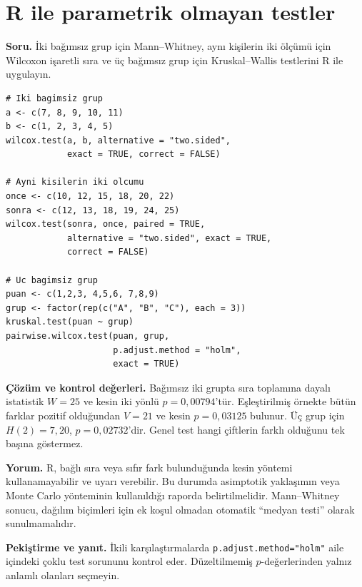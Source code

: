 \section{R ile parametrik olmayan testler}
\label{sec:r-nonparametric}

\textbf{Soru.} İki bağımsız grup için Mann--Whitney, aynı kişilerin iki
ölçümü için Wilcoxon işaretli sıra ve üç bağımsız grup için Kruskal--Wallis
testlerini R ile uygulayın.

\begin{lstlisting}[style=prismR]
# Iki bagimsiz grup
a <- c(7, 8, 9, 10, 11)
b <- c(1, 2, 3, 4, 5)
wilcox.test(a, b, alternative = "two.sided",
            exact = TRUE, correct = FALSE)

# Ayni kisilerin iki olcumu
once <- c(10, 12, 15, 18, 20, 22)
sonra <- c(12, 13, 18, 19, 24, 25)
wilcox.test(sonra, once, paired = TRUE,
            alternative = "two.sided", exact = TRUE,
            correct = FALSE)

# Uc bagimsiz grup
puan <- c(1,2,3, 4,5,6, 7,8,9)
grup <- factor(rep(c("A", "B", "C"), each = 3))
kruskal.test(puan ~ grup)
pairwise.wilcox.test(puan, grup,
                     p.adjust.method = "holm",
                     exact = TRUE)
\end{lstlisting}

\begin{outputguidebox}
\textbf{Çözüm ve kontrol değerleri.} Bağımsız iki grupta sıra toplamına
dayalı istatistik $W=25$ ve kesin iki yönlü $p=0{,}00794$'tür.
Eşleştirilmiş örnekte bütün farklar pozitif olduğundan $V=21$ ve kesin
$p=0{,}03125$ bulunur. Üç grup için $H(2)=7{,}20$, $p=0{,}02732$'dir.
Genel test hangi çiftlerin farklı olduğunu tek başına göstermez.
\end{outputguidebox}

\textbf{Yorum.} R, bağlı sıra veya sıfır fark bulunduğunda kesin yöntemi
kullanamayabilir ve uyarı verebilir. Bu durumda asimptotik yaklaşımın veya
Monte Carlo yönteminin kullanıldığı raporda belirtilmelidir. Mann--Whitney
sonucu, dağılım biçimleri için ek koşul olmadan otomatik ``medyan testi''
olarak sunulmamalıdır.

\textbf{Pekiştirme ve yanıt.} İkili karşılaştırmalarda
\texttt{p.adjust.method="holm"} aile içindeki çoklu test sorununu kontrol
eder. Düzeltilmemiş $p$-değerlerinden yalnız anlamlı olanları seçmeyin.